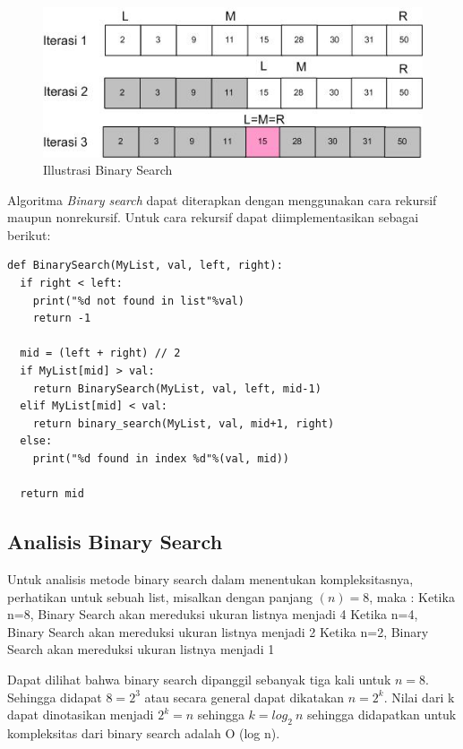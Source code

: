\begin{figure}[htbp]
\begin{center}
	\includegraphics[scale=0.8]{fig/sunario-3/BinarySearch.jpg}%
	\caption{Illustrasi Binary Search}%
	\label{fig:Binary Search Ilustration}%
\end{center}
\end{figure}

\newpage{}
Algoritma \textit{Binary search} dapat diterapkan dengan menggunakan cara rekursif maupun nonrekursif. Untuk cara rekursif dapat diimplementasikan sebagai berikut:

\lstset{language=Python}
\label{lst:BinarySearch}
\begin{lstlisting}[frame=single]
def BinarySearch(MyList, val, left, right):
  if right < left:
    print("%d not found in list"%val)
    return -1
	
  mid = (left + right) // 2
  if MyList[mid] > val:
    return BinarySearch(MyList, val, left, mid-1)
  elif MyList[mid] < val:
    return binary_search(MyList, val, mid+1, right)
  else:
    print("%d found in index %d"%(val, mid))
  
  return mid
\end{lstlisting}

\subsection{Analisis Binary Search}
Untuk analisis metode binary search dalam menentukan kompleksitasnya, perhatikan untuk sebuah list, misalkan dengan panjang $(n) = 8$, maka :\newline
Ketika n=8, Binary Search akan mereduksi ukuran listnya menjadi 4\newline
Ketika n=4, Binary Search akan mereduksi ukuran listnya menjadi 2\newline
Ketika n=2, Binary Search akan mereduksi ukuran listnya menjadi 1\newline

Dapat dilihat bahwa binary search dipanggil sebanyak tiga kali untuk $n = 8$. Sehingga didapat $8 = 2^{3}$ atau secara general dapat dikatakan $n = 2^{k}$.  Nilai dari k dapat dinotasikan menjadi $2^{k} = n$ sehingga $k = log_2\ n$ sehingga didapatkan untuk kompleksitas dari binary search adalah  O (log n).

